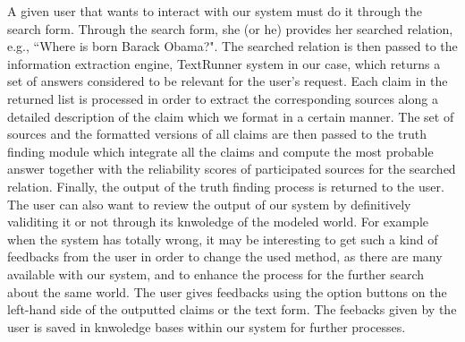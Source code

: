 A given user that wants to interact with our system
must do it through the search form. Through the search
form, she (or he) provides her searched relation, e.g.,
``Where is born Barack Obama?".
The searched relation is then 
passed to the information extraction engine,  TextRunner system
in our case, which returns a set of answers considered to be 
relevant for the user's request. Each claim in the returned list is
processed in order to extract the corresponding sources along a detailed
description of the claim which we format in a certain manner. The 
set of sources and the formatted versions of all claims are then passed
to the truth finding module which integrate all the claims and compute the
most probable answer together with the reliability scores of participated 
sources for the searched relation. Finally, the output of the truth finding
process is returned to the user. The user can also want to review the output
of our system by definitively validiting it or not through its knwoledge of the
modeled world. For example when the system has totally wrong, it may be interesting
to get such a kind of feedbacks from the user in order to change the used method, as
there are many available with our system, and to enhance the process for the further 
search about the same world. The user gives feedbacks using the option buttons on the 
left-hand side of the outputted claims or the text form. The feebacks given by the user
is saved in knwoledge bases within our system for further processes.
